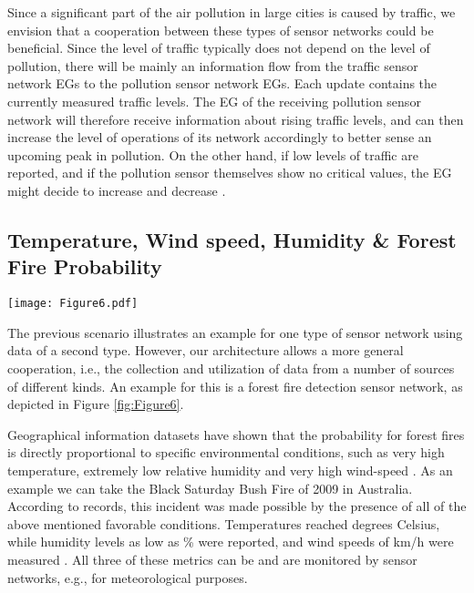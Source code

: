 \documentclass[onecolumn]{jaise2e}
\begin{document}
Since a significant part of the air pollution in large cities is caused by traffic, we envision that a cooperation between these types of sensor networks could be beneficial. Since the level of traffic typically does not depend on the level of pollution, there will be mainly an information flow from the traffic sensor network EGs to the pollution sensor network EGs. Each update contains the currently measured traffic levels. The EG of the receiving pollution sensor network will therefore receive information about rising traffic levels, and can then increase the level of operations of its network accordingly to better sense an upcoming peak in pollution. On the other hand, if low levels of traffic are reported, and if the pollution sensor themselves show no critical values, the EG might decide to increase  and decrease .
 

\subsection{Temperature, Wind speed, Humidity \& Forest Fire Probability}

\begin{figure*}[t]
\centering
\texttt{[image: Figure6.pdf]} 
\caption{Temperature, Wind speed, Humidity \& Forest Fire Probability}
\label{fig:Figure6}
\end{figure*}

The previous scenario illustrates an example for one type of sensor network using data of a second type. However, our architecture allows a more general cooperation, i.e., the collection and utilization of data from a number of sources of different kinds. An example for this is a forest fire detection sensor network, as depicted in Figure \ref{fig:Figure6}.

Geographical information datasets have shown that the probability for forest fires is directly proportional to specific environmental conditions, such as very high temperature, extremely low relative humidity and very high wind-speed \cite{ref-journal15}. As an example we can take the Black Saturday Bush Fire of 2009 in Australia. According to records, this incident was made possible by the presence of all of the above mentioned favorable conditions. Temperatures reached  degrees Celsius, while humidity levels as low as \% were reported, and wind speeds of  km/h were measured \cite{ref-journal14}. All three of these metrics can be and are monitored by sensor networks, e.g., for meteorological purposes.
\end{document}

